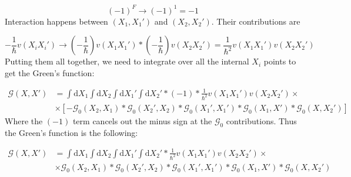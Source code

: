 \begin{equation} \label{eq:20}
\left( -1 \right)^{F} \to \left( -1 \right)^{1} = -1
\end{equation}
Interaction happens between $\left( X_{1}, X_{1}' \right)$ and $\left( X_{2}, X_{2}' \right)$. Their contributions are

\begin{equation} \label{eq:21}
- \frac{1}{\hbar} v \left( X_{i} X_{i}' \right)
\to
\left( - \frac{1}{\hbar} \right) v \left( X_{1} X_{1}' \right)
*
\left( - \frac{1}{\hbar} \right) v \left( X_{2} X_{2}' \right)
=
\frac{1}{\hbar^{2}} v \left( X_{1} X_{1}' \right) v \left( X_{2} X_{2}' \right)
\end{equation}
Putting them all together, we need to integrate over all the internal $X_{i}$ points to get the Green's function:

\begin{align} \label{eq:22}
\mathcal{G} \left( X, X' \right)
&=
\int \text{d}X_{1} \int \text{d}X_{2} \int \text{d}X_{1}' \int \text{d}X_{2}'
*
\left( -1 \right)
*
\frac{1}{\hbar^{2}} v \left( X_{1} X_{1}' \right) v \left( X_{2} X_{2}' \right)
\times \nonumber \\
&\times
\left[
- \mathcal{G}_{0} \left( X_{2}, X_{1} \right)
*
\mathcal{G}_{0} \left( X_{2}', X_{2} \right)
*
\mathcal{G}_{0} \left( X_{1}', X_{1}' \right)
*
\mathcal{G}_{0} \left( X_{1}, X' \right)
*
\mathcal{G}_{0} \left( X, X_{2}' \right)
\right]
\end{align}
Where the $(-1)$ term cancels out the minus sign at the $\mathcal{G}_{0}$ contributions. Thus the Green's function is the following:

\begin{align} \label{eq:23}
\mathcal{G} \left( X, X' \right)
&=
\int \text{d}X_{1} \int \text{d}X_{2} \int \text{d}X_{1}' \int \text{d}X_{2}'
*
\frac{1}{\hbar^{2}} v \left( X_{1} X_{1}' \right) v \left( X_{2} X_{2}' \right)
\times \nonumber \\
&\times
\mathcal{G}_{0} \left( X_{2}, X_{1} \right)
*
\mathcal{G}_{0} \left( X_{2}', X_{2} \right)
*
\mathcal{G}_{0} \left( X_{1}', X_{1}' \right)
*
\mathcal{G}_{0} \left( X_{1}, X' \right)
*
\mathcal{G}_{0} \left( X, X_{2}' \right)
\end{align}